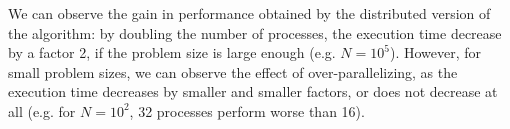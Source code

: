 \documentclass[]{finalproject}
\begin{document}
We can observe the gain in performance obtained by the distributed version of the algorithm:
by doubling the number of processes, the execution time decrease by a factor 2, if the problem size is large enough (e.g. $N=10^5$).
However, for small problem sizes, we can observe the effect of over-parallelizing,
as the execution time decreases by smaller and smaller factors, or does not decrease at all
(e.g. for $N=10^2$, 32 processes perform worse than 16).

\clearpage


\end{document}
